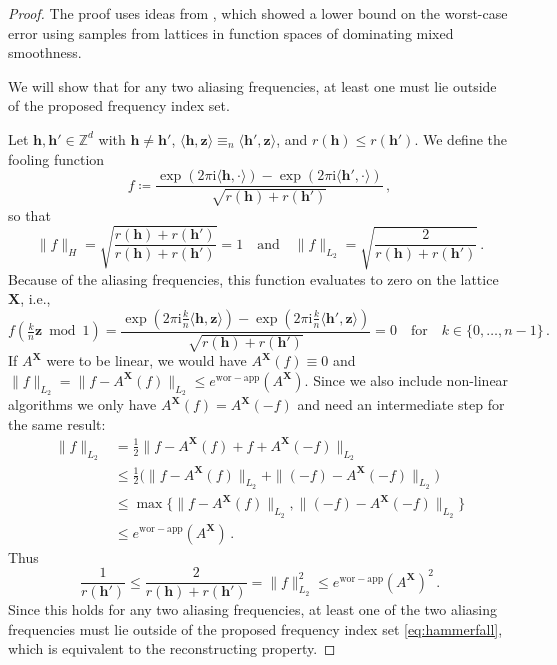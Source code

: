 \documentclass[a4paper]{amsart}
\newcommand{\ewc}{e^{\mathrm{wor-app}}}
\newcommand{\modone}{\bmod{}1}
\begin{document}
\begin{proof} The proof uses ideas from \cite[Theorem~3.2]{BKUV17}, which showed a lower bound on the worst-case error using samples from lattices in function spaces of dominating mixed smoothness.

    We will show that for any two aliasing frequencies, at least one must lie outside of the proposed frequency index set.

    Let $\bm h, \bm h'\in\mathds Z^d$ with $\bm h\neq\bm h'$, $\langle\bm h, \bm z\rangle \equiv_n \langle\bm h', \bm z\rangle$, and $r(\bm h)\le r(\bm h')$.
    We define the fooling function
    \begin{equation*}
        f \coloneqq \frac{\exp(2\pi\mathrm i\langle\bm h, \cdot\rangle) - \exp(2\pi\mathrm i\langle\bm h', \cdot\rangle) }{\sqrt{r(\bm h)+r(\bm h')}} \,,
    \end{equation*}
    so that
    \begin{equation*}
        \|f\|_{H}
        = \sqrt{\frac{r(\bm h)+r(\bm h')}{r(\bm h)+r(\bm h')}}
        = 1
        \quad\text{and}\quad
        \|f\|_{L_2} = \sqrt{\frac{2}{r(\bm h)+r(\bm h')}} \,.
    \end{equation*}
    Because of the aliasing frequencies, this function evaluates to zero on the lattice $\bm X$, i.e.,
    \begin{equation*}
        f(\tfrac kn\bm z\modone)
        = \frac{\exp(2\pi\mathrm i\frac kn \langle\bm h, \bm z\rangle) - \exp(2\pi\mathrm i\frac kn \langle\bm h', \bm z\rangle) }{\sqrt{r(\bm h)+r(\bm h')}}
        = 0
        \quad\text{for}\quad
        k\in\{0, \dots, n-1\}\,.
    \end{equation*}
    If $A^{\bm X}$ were to be linear, we would have $A^{\bm X}(f) \equiv 0$ and $\|f\|_{L_2} = \|f-A^{\bm X}(f)\|_{L_2} \le \ewc(A^{\bm X})$.
    Since we also include non-linear algorithms we only have $A^{\bm X}(f) = A^{\bm X}(-f)$ and need an intermediate step for the same result:
    \begin{align*}
        \|f\|_{L_2}
        &= \frac 12 \|f - A^{\bm X}(f) + f + A^{\bm X}(-f)\|_{L_2} \\
        &\le \frac 12 \Big(\|f - A^{\bm X}(f)\|_{L_2} + \|(-f) - A^{\bm X}(-f)\|_{L_2}\Big) \\
        &\le \max\Big\{ \|f - A^{\bm X}(f)\|_{L_2}, \|(-f) - A^{\bm X}(-f)\|_{L_2} \Big\} \\
        &\le \ewc(A^{\bm X}) \,.
    \end{align*}
    Thus
    \begin{equation*}
        \frac{1}{r(\bm h')}
        \le \frac{2}{r(\bm h)+r(\bm h')}
        = \|f\|_{L_2}^{2}
        \le \ewc(A^{\bm X})^2 \,.
    \end{equation*}
    Since this holds for any two aliasing frequencies, at least one of the two aliasing frequencies must lie outside of the proposed frequency index set \eqref{eq:hammerfall}, which is equivalent to the reconstructing property.
\end{proof} 
\end{document}
